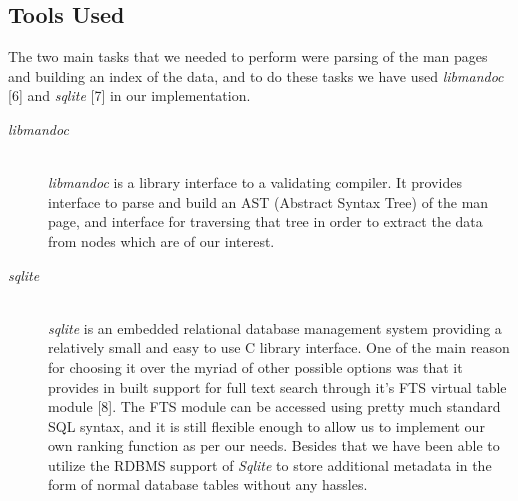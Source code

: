 \documentclass[titlepage, a4paper, 12pt]{article}
\begin{document}
\subsection{Tools Used}
The two main tasks that we needed to perform were parsing of the man pages and
building an index of the data, and to do these tasks we have used \textit{libmandoc} [6]
and \textit{sqlite} [7] in our implementation.
\begin{description}
\item[\textit{libmandoc}] \hfill \\
\textit{libmandoc} is a library interface to a validating compiler. It provides
interface to parse and build an AST (Abstract Syntax Tree) of the man page, 
and interface for traversing that tree in order to extract the data from nodes
which are of our interest.
\end{description}
\begin{description}
\item[\textit{sqlite}] \hfill \\
\textit{sqlite} is an embedded relational database management system providing a
relatively small and easy to use C library interface. One of the main reason
for choosing it over the myriad of other possible options was that it provides
in built support for full text search through it's FTS virtual table module [8].
The FTS module can be accessed using pretty much standard SQL syntax, and it is
still flexible enough to allow us to implement our own ranking function as
per our needs. Besides that we have been able to utilize the RDBMS support of
\textit{Sqlite} to store additional metadata in the form of normal database
tables without any hassles.
\end{description}
\end{document}
